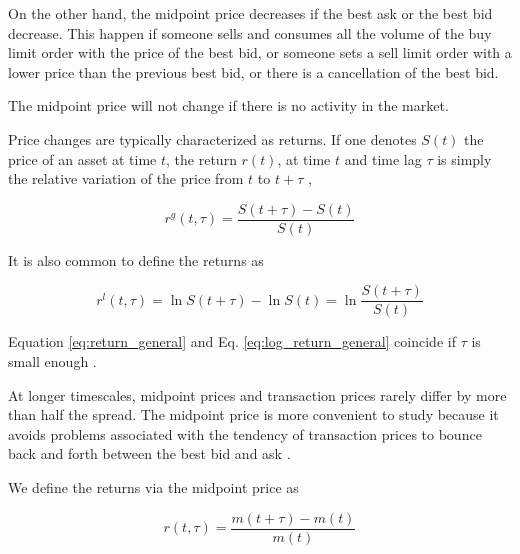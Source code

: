 On the other hand, the midpoint price decreases if the best ask or the best bid
decrease. This happen if someone sells and consumes all the volume of the buy
limit order with the price of the best bid, or someone sets a sell limit order
with a lower price than the previous best bid, or there is a cancellation of
the best bid.

The midpoint price will not change if there is no activity in the market.

Price changes are typically characterized as returns. If one denotes
$S\left( t\right)$ the price of an asset at time $t$, the return
$r\left(t\right)$, at time $t$ and time lag $\tau$ is simply the relative
variation of the price from $t$ to $t + \tau$
\cite{subtle_nature,empirical_facts,asynchrony_effects_corr,tick_size_impact,causes_epps_effect,non_stationarity},

\begin{equation}\label{eq:return_general}
    r^{g} \left(t, \tau \right) = \frac{S\left(t + \tau\right)
    - S\left(t\right)}{S\left(t\right)}
\end{equation}

It is also common to define the returns as
\cite{dissecting_cross,subtle_nature,empirical_facts,empirical_properties,large_prices_changes,theory_market_impact,spread_changes_affect,fluctions_market_friction,pow_law_dist,rand_mat}

\begin{equation}\label{eq:log_return_general}
    r^{l}\left(t,\tau\right) = \ln S\left(t + \tau\right)
    - \ln S\left(t\right) = \ln \frac{S\left(t + \tau\right)}{S\left(t\right)}
\end{equation}

Equation \ref{eq:return_general} and Eq. \ref{eq:log_return_general} coincide
if $\tau$ is small enough \cite{subtle_nature,empirical_facts}.

At longer timescales, midpoint prices and transaction prices rarely differ by
more than half the spread. The midpoint price is more convenient to study
because it avoids problems associated with the tendency of transaction prices
to bounce back and forth between the best bid and ask
\cite{large_prices_changes}.

We define the returns via the midpoint price as

\begin{equation}\label{eq:midpoint_price_return}
    r\left(t,\tau\right) = \frac{m\left(t+\tau\right)-m\left(t\right)}
    {m\left(t\right)}
\end{equation}

